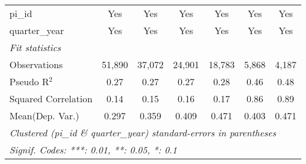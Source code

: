 \begin{tabular}{lcccccc}
   pi\_id                                                     & Yes           & Yes            & Yes           & Yes           & Yes           & Yes\\  
   quarter\_year                                              & Yes           & Yes            & Yes           & Yes           & Yes           & Yes\\  
   \midrule
   \emph{Fit statistics}\\
   Observations                                               & 51,890        & 37,072         & 24,901        & 18,783        & 5,868         & 4,187\\  
   Pseudo R$^2$                                               & 0.27          & 0.27           & 0.27          & 0.28          & 0.46          & 0.48\\  
   Squared Correlation                                        & 0.14          & 0.15           & 0.16          & 0.17          & 0.86          & 0.89\\  
Mean(Dep. Var.) & 0.297 & 0.359 & 0.409 & 0.471 & 0.403 & 0.471 \\
   \midrule \midrule
   \multicolumn{7}{l}{\emph{Clustered (pi\_id \& quarter\_year) standard-errors in parentheses}}\\
   \multicolumn{7}{l}{\emph{Signif. Codes: ***: 0.01, **: 0.05, *: 0.1}}\\
\end{tabular}
\par\endgroup
